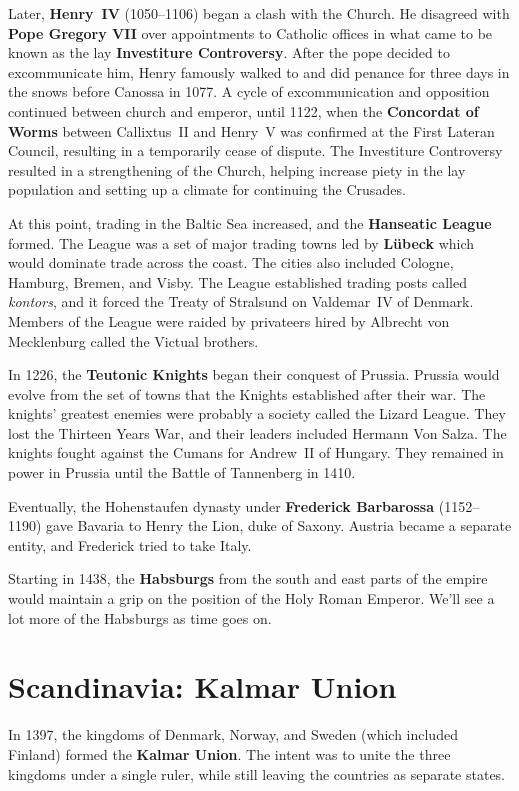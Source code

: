 Later, \textbf{Henry~IV} (1050--1106) began a clash with the Church.
He disagreed with \textbf{Pope Gregory VII} over appointments to Catholic offices
in what came to be known as the lay \textbf{Investiture Controversy}.
After the pope decided to excommunicate him,
Henry famously walked to and did penance for three days in the snows before Canossa in 1077.
A cycle of excommunication and opposition continued between church and emperor,
until 1122, when the \textbf{Concordat of Worms} between Callixtus~II and Henry~V
was confirmed at the First Lateran Council,
resulting in a temporarily cease of dispute.
The Investiture Controversy resulted in a strengthening of the Church,
helping increase piety in the lay population and setting up a climate for continuing the Crusades.

At this point, trading in the Baltic Sea increased, and the \textbf{Hanseatic League} formed.
The League was a set of major trading towns led by \textbf{L\"ubeck} which would dominate trade across the coast.
The cities also included Cologne, Hamburg, Bremen, and Visby.
The League established trading posts called \textit{kontors},
and it forced the Treaty of Stralsund on Valdemar~IV of Denmark.
Members of the League were raided by privateers hired by Albrecht von Mecklenburg called the Victual brothers.

In 1226, the \textbf{Teutonic Knights} began their conquest of Prussia.
Prussia would evolve from the set of towns that the Knights established after their war.
The knights' greatest enemies were probably a society called the Lizard League.
They lost the Thirteen Years War, and their leaders included Hermann Von Salza.
The knights fought against the Cumans for Andrew~II of Hungary.
They remained in power in Prussia until the Battle of Tannenberg in 1410.

Eventually, the Hohenstaufen dynasty under \textbf{Frederick Barbarossa} (1152--1190)
gave Bavaria to Henry the Lion, duke of Saxony.
Austria became a separate entity, and Frederick tried to take Italy.

Starting in 1438, the \textbf{Habsburgs} from the south and east parts of the empire
would maintain a grip on the position of the Holy Roman Emperor.
We'll see a lot more of the Habsburgs as time goes on.

\section{Scandinavia: Kalmar Union}

In 1397, the kingdoms of Denmark, Norway, and Sweden (which included Finland) formed the \textbf{Kalmar Union}.
The intent was to unite the three kingdoms under a single ruler,
while still leaving the countries as separate states.

